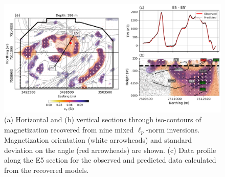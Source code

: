 \documentclass[paper]{geophysics}
\begin{document}
\begin{figure}[p!]
\includegraphics[width=\columnwidth]{Figures/Figure15.png}
\caption{(a) Horizontal and (b) vertical sections through iso-contours of magnetization recovered from nine mixed $\ell_p$-norm inversions. Magnetization orientation (white arrowheads) and standard deviation on the angle (red arrowheads) are shown. (c) Data profile along the E5 section for the observed and predicted data calculated from the recovered models.}
\label{MVIS_Iso_model}
\end{figure}
\end{document}
